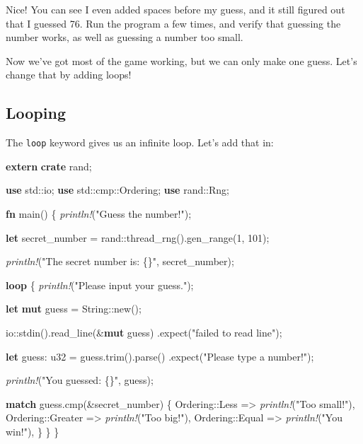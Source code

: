 \documentclass[a4paper,]{book}
\newenvironment{Shaded}{\begin{snugshade}}{\end{snugshade}}
\newcommand{\KeywordTok}[1]{\textcolor[rgb]{0.13,0.29,0.53}{\textbf{{#1}}}}
\newcommand{\DataTypeTok}[1]{\textcolor[rgb]{0.13,0.29,0.53}{{#1}}}
\newcommand{\DecValTok}[1]{\textcolor[rgb]{0.00,0.00,0.81}{{#1}}}
\newcommand{\StringTok}[1]{\textcolor[rgb]{0.31,0.60,0.02}{{#1}}}
\newcommand{\PreprocessorTok}[1]{\textcolor[rgb]{0.56,0.35,0.01}{\textit{{#1}}}}
\newcommand{\NormalTok}[1]{{#1}}
\begin{document}
Nice! You can see I even added spaces before my guess, and it still
figured out that I guessed 76. Run the program a few times, and verify
that guessing the number works, as well as guessing a number too small.

Now we've got most of the game working, but we can only make one guess.
Let's change that by adding loops!

\subsection{Looping}\label{looping}

The \texttt{loop} keyword gives us an infinite loop. Let's add that in:

\begin{Shaded}
\begin{Highlighting}[]
\KeywordTok{extern} \KeywordTok{crate} \NormalTok{rand;}

\KeywordTok{use} \NormalTok{std::io;}
\KeywordTok{use} \NormalTok{std::cmp::Ordering;}
\KeywordTok{use} \NormalTok{rand::Rng;}

\KeywordTok{fn} \NormalTok{main() \{}
    \PreprocessorTok{println!}\NormalTok{(}\StringTok{"Guess the number!"}\NormalTok{);}

    \KeywordTok{let} \NormalTok{secret_number = rand::thread_rng().gen_range(}\DecValTok{1}\NormalTok{, }\DecValTok{101}\NormalTok{);}

    \PreprocessorTok{println!}\NormalTok{(}\StringTok{"The secret number is: \{\}"}\NormalTok{, secret_number);}

    \KeywordTok{loop} \NormalTok{\{}
        \PreprocessorTok{println!}\NormalTok{(}\StringTok{"Please input your guess."}\NormalTok{);}

        \KeywordTok{let} \KeywordTok{mut} \NormalTok{guess = }\DataTypeTok{String}\NormalTok{::new();}

        \NormalTok{io::stdin().read_line(&}\KeywordTok{mut} \NormalTok{guess)}
            \NormalTok{.expect(}\StringTok{"failed to read line"}\NormalTok{);}

        \KeywordTok{let} \NormalTok{guess: }\DataTypeTok{u32} \NormalTok{= guess.trim().parse()}
            \NormalTok{.expect(}\StringTok{"Please type a number!"}\NormalTok{);}

        \PreprocessorTok{println!}\NormalTok{(}\StringTok{"You guessed: \{\}"}\NormalTok{, guess);}

        \KeywordTok{match} \NormalTok{guess.cmp(&secret_number) \{}
            \NormalTok{Ordering::Less    => }\PreprocessorTok{println!}\NormalTok{(}\StringTok{"Too small!"}\NormalTok{),}
            \NormalTok{Ordering::Greater => }\PreprocessorTok{println!}\NormalTok{(}\StringTok{"Too big!"}\NormalTok{),}
            \NormalTok{Ordering::Equal   => }\PreprocessorTok{println!}\NormalTok{(}\StringTok{"You win!"}\NormalTok{),}
        \NormalTok{\}}
    \NormalTok{\}}
\NormalTok{\}}
\end{Highlighting}
\end{Shaded}
\end{document}
